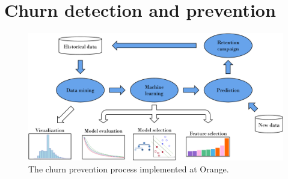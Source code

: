 \section{Churn detection and prevention}

\begin{figure}[ht]
    \centering
    \includegraphics[width=\linewidth]{figures/churn_diagram}
    \caption{The churn prevention process implemented at Orange.}
    \label{churn_diagram}
\end{figure}

